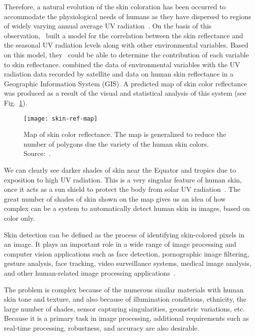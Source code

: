 Therefore, a natural evolution of the skin coloration has been occurred to accommodate the physiological needs of humans as they have dispersed to regions of widely varying annual average UV radiation~\citep{jablonski:10}. On the basis of this observation,~\citet{chaplin:04} built a model for the correlation between the skin reflectance and the seasonal UV radiation levels along with other environmental variables. Based on this model, they~\citep{chaplin:04} could be able to determine the contribution of each variable to skin reflectance. \citet{chaplin:04} combined the data of environmental variables with the UV radiation data recorded by satellite and data on human skin reflectance in a Geographic Information System (GIS). A predicted map of skin color reflectance was produced as a result of the visual and statistical analysis of this system (see Fig.~\ref{fig:skin-ref-map}).


\begin{figure}[!hb]
  \centering
  \texttt{[image: skin-ref-map]}
  \caption[Map of skin color reflectance]{Map of skin color reflectance. The map is generalized to reduce the number of polygons due the variety of the human skin colors. Source:~\citet{chaplin:04}.}
  \label{fig:skin-ref-map}
\end{figure}

We can clearly see darker shades of skin near the Equator and tropics due to exposition to high UV radiation. This is a very singular feature of human skin, once it acts as a sun shield to protect the body from solar UV radiation~\citep{jablonski:04}. The great number of shades of skin shown on the map gives us an idea of how complex can be a system to automatically detect human skin in images, based on color only.

Skin detection can be defined as the process of identifying skin-colored pixels in an image. It plays an important role in a wide range of image processing and computer vision applications such as face detection, pornographic image filtering, gesture analysis, face tracking, video surveillance systems, medical image analysis, and other human-related image processing applications~\citep{kakumanu:07}.

The problem is complex because of the numerous similar materials with human skin tone and texture, and also because of illumination conditions, ethnicity, the large number of shades, sensor capturing singularities, geometric variations, etc. Because it is a primary task in image processing, additional requirements such as real-time processing, robustness, and accuracy are also desirable.

